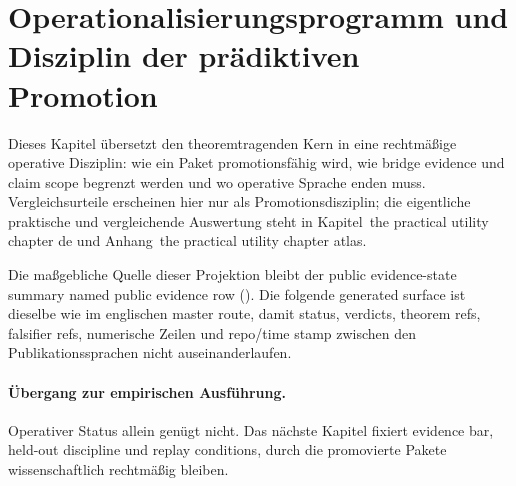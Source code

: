 \section{Operationalisierungsprogramm und Disziplin der prädiktiven Promotion}
\label{sec:oc-core-1-3-operationalization-program-de}

Dieses Kapitel übersetzt den theoremtragenden Kern in eine rechtmäßige
operative Disziplin: wie ein Paket promotionsfähig wird, wie bridge evidence
und claim scope begrenzt werden und wo operative Sprache enden muss.
Vergleichsurteile erscheinen hier nur als Promotionsdisziplin; die eigentliche
praktische und vergleichende Auswertung steht in
Kapitel~the practical utility chapter de und
Anhang~the practical utility chapter atlas.

Die maßgebliche Quelle dieser Projektion bleibt der public evidence-state summary
named public evidence row
(). Die folgende generated surface ist
dieselbe wie im englischen master route, damit status, verdicts, theorem refs,
falsifier refs, numerische Zeilen und repo/time stamp zwischen den
Publikationssprachen nicht auseinanderlaufen.

\begingroup
\small

\endgroup

\paragraph{Übergang zur empirischen Ausführung.}
Operativer Status allein genügt nicht. Das nächste Kapitel fixiert evidence
bar, held-out discipline und replay conditions, durch die promovierte Pakete
wissenschaftlich rechtmäßig bleiben.
